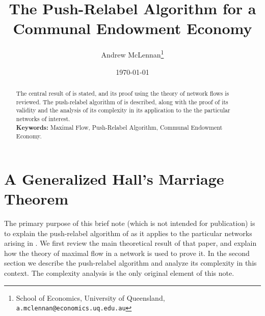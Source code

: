\documentclass[12pt, A4paper]{article}
\theoremstyle{definition}
\begin{document}
\title{The Push-Relabel Algorithm for a Communal Endowment Economy}

\author{Andrew McLennan\footnote{School of Economics, University of
    Queensland, {\tt a.mclennan@economics.uq.edu.au}}}

\date{\today}

\maketitle

\begin{abstract}
The central result of \cite{MTT23} is stated, and its proof using the theory of network flows is reviewed.  The push-relabel algorithm of \cite{GoTa88} is described, along with the proof of its validity and the analysis of its complexity in its application to the the particular networks of interest.
\smallskip
\\%
\noindent \textbf{Keywords:} Maximal Flow, Push-Relabel Algorithm, Communal Endowment Economy.
\end{abstract}

\medskip

\section{A Generalized Hall's Marriage Theorem} \label{sec:GenHall}

The primary purpose of this brief note (which is not intended for publication) is to explain the push-relabel algorithm of \cite{GoTa88} as it applies to the particular networks arising in \cite{MTT23}.  We first review the main theoretical result of that paper, and explain how the theory of maximal flow in a network is used to prove it.  In the second section we describe the push-relabel algorithm and analyze its complexity in this context.  The complexity analysis is the only original element of this note.
\end{document}
